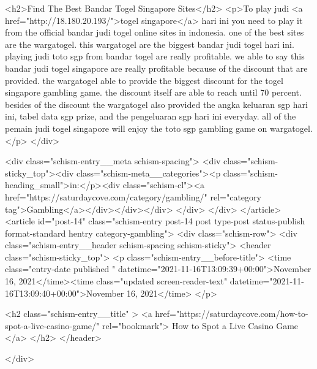 {<h2>Find The Best Bandar Togel Singapore Sites</h2>
<p>To play judi <a href="http://18.180.20.193/">togel singapore</a> hari ini you need to play it from the official bandar judi togel online sites in indonesia. one of the best sites are the wargatogel. this wargatogel are the biggest bandar judi togel hari ini. playing judi toto sgp from bandar togel are really profitable. we able to say this bandar judi togel singapore are really profitable because of the discount that are provided. the wargatogel able to provide the biggest discount for the togel singapore gambling game. the discount itself are able to reach until 70 percent. besides of the discount the wargatogel also provided the angka keluaran sgp hari ini, tabel data sgp prize, and the pengeluaran sgp hari ini everyday. all of the pemain judi togel singapore will enjoy the toto sgp gambling game on wargatogel.</p>
		</div>

		<div class="schism-entry__meta schism-spacing">			<div class="schism-sticky_top"><div class="schism-meta__categories"><p class="schism-heading_small">in:</p><div class="schism-cl"><a href="https://saturdaycove.com/category/gambling/" rel="category tag">Gambling</a></div></div></div>		</div>
	</div>
</article>
<article id="post-14" class="schism-entry post-14 post type-post status-publish format-standard hentry category-gambling">
	<div class="schism-row">		<div class="schism-entry__header schism-spacing schism-sticky">			<header class="schism-sticky_top">				<p class="schism-entry__before-title">
					<time class="entry-date published " datetime="2021-11-16T13:09:39+00:00">November 16, 2021</time><time class="updated screen-reader-text" datetime="2021-11-16T13:09:40+00:00">November 16, 2021</time>				</p>

				<h2 class="schism-entry__title" >
					<a href="https://saturdaycove.com/how-to-spot-a-live-casino-game/" rel="bookmark">
						How to Spot a Live Casino Game					</a>
				</h2>
			</header>

					</div>

}
